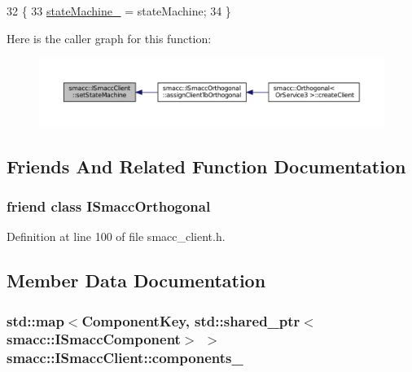 \begin{DoxyCode}
32 \{
33     \hyperlink{classsmacc_1_1ISmaccClient_a926e4f2ae796def63d48dca389a48c47}{stateMachine\_} = stateMachine;
34 \}
\end{DoxyCode}


Here is the caller graph for this function\+:
\nopagebreak
\begin{figure}[H]
\begin{center}
\leavevmode
\includegraphics[width=350pt]{classsmacc_1_1ISmaccClient_a28fd6ca2bcf9c5e57f3cc16fb0a076d3_icgraph}
\end{center}
\end{figure}




\subsection{Friends And Related Function Documentation}
\subsubsection[{\texorpdfstring{I\+Smacc\+Orthogonal}{ISmaccOrthogonal}}]{\setlength{\rightskip}{0pt plus 5cm}friend class {\bf I\+Smacc\+Orthogonal}\hspace{0.3cm}{\ttfamily [friend]}}\hypertarget{classsmacc_1_1ISmaccClient_a7205cc84a71fea903124d54d01e99a68}{}\label{classsmacc_1_1ISmaccClient_a7205cc84a71fea903124d54d01e99a68}


Definition at line 100 of file smacc\+\_\+client.\+h.



\subsection{Member Data Documentation}
\subsubsection[{\texorpdfstring{components\+\_\+}{components_}}]{\setlength{\rightskip}{0pt plus 5cm}std\+::map$<${\bf Component\+Key}, std\+::shared\+\_\+ptr$<${\bf smacc\+::\+I\+Smacc\+Component}$>$ $>$ smacc\+::\+I\+Smacc\+Client\+::components\+\_\+\hspace{0.3cm}{\ttfamily [protected]}}\hypertarget{classsmacc_1_1ISmaccClient_a9e670e9071bb549dbeb08985d0114afe}{}\label{classsmacc_1_1ISmaccClient_a9e670e9071bb549dbeb08985d0114afe}


